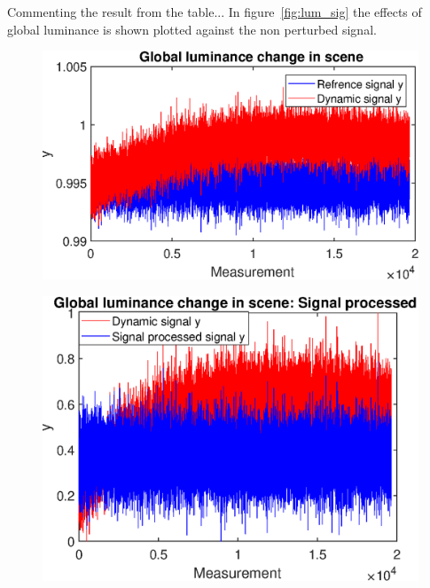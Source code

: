 Commenting the result from the table... In figure~\ref{fig:lum_sig} the effects of global luminance is shown plotted against the non perturbed signal.\\[0.1in]


\begin{figure}[H]
    \centering
\begin{minipage}[t]{0.495\textwidth}
    \includegraphics[width=1\textwidth]{result/dynamic/lum/intense_change.eps}
    \label{fig:lum_sig_1}
\end{minipage}
\begin{minipage}[t]{0.495\textwidth}
    \includegraphics[width = \textwidth]{result/dynamic/lum/intense_change_sp.eps}
    \label{fig:lum_sig_2}
\end{minipage}
\begin{minipage}[t]{0.495\textwidth}

\end{minipage}
\end{figure}

